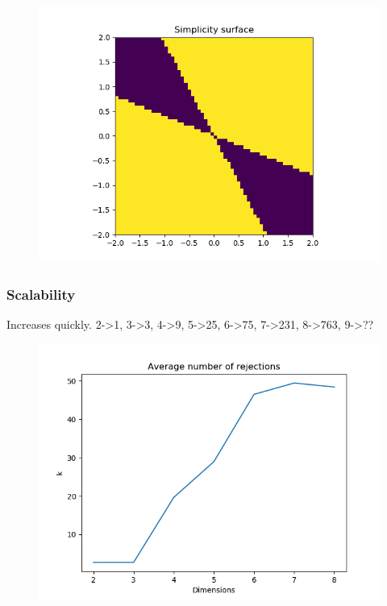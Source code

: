 \begin{figure}[h!]
\centering
\includegraphics[width=1\textwidth,height=0.5\textheight]{../../pictures/figures/complexity_surface_nd-4d-S-2.png}
\caption{}
\end{figure}

\subsubsection{Scalability}

Increases quickly. 2->1, 3->3, 4->9, 5->25, 6->75, 7->231, 8->763, 9->??

\begin{figure}[h!]
\centering
\includegraphics[width=1\textwidth,height=0.5\textheight]{../../pictures/figures/ks.png}
\caption{}
\end{figure}


